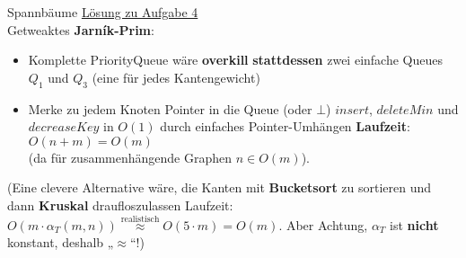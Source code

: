\begin{frame}{Spannbäume}
	\underline{Lösung zu Aufgabe 4} \\
	Getweaktes \textbf{Jarník-Prim}: \\
	\begin{itemize}
		\item Komplette PriorityQueue wäre \textbf{overkill} \impl \textbf{stattdessen} zwei einfache Queues $Q_1$ und $Q_3$ \quad (eine für jedes Kantengewicht)
		\item Merke zu jedem Knoten Pointer in die Queue (oder $\bot$)
		\implitem $insert$, $deleteMin$ und $decreaseKey$ in $O(1)$ durch einfaches Pointer-Umhängen
		\implitem \textbf{Laufzeit}: $O(n + m) = O(m)$ \\ (da für zusammenhängende Graphen $n \in O(m)$).
	\end{itemize}
	\forcenewline
	(Eine clevere Alternative wäre, die Kanten mit \textbf{Bucketsort} zu sortieren und dann \textbf{Kruskal} draufloszulassen \impl Laufzeit: $O\left(m \cdot \alpha_T(m, n)\right) \stackrel{\text{realistisch}}{\approx} O(5 \cdot m) = O(m)$. {\small Aber Achtung, $\alpha_T$ ist \textbf{nicht} konstant, deshalb „$\approx$“!})
\end{frame}



\iffalse

\begin{frame}{Graphen}
	\underline{Aufgabe 5: } \\
	Konstruiert einen gerichteten Graphen mit $n$ Knoten und negativen Kantengewichten (aber \textbf{ohne} negative Zyklen!) so, dass Dijkstra darauf eine Laufzeit in $\Theta(n^3\log n)$ erreicht.
\end{frame}

\fi



